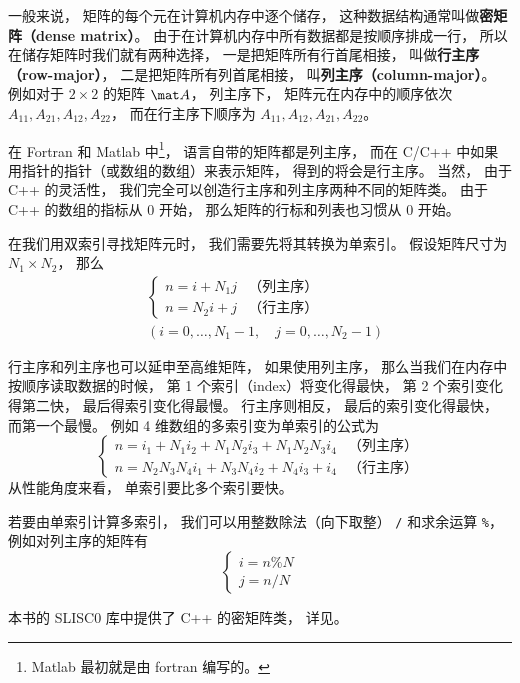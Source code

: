 

一般来说， 矩阵的每个元在计算机内存中逐个储存， 这种数据结构通常叫做\textbf{密矩阵（dense matrix）}。 由于在计算机内存中所有数据都是按顺序排成一行， 所以在储存矩阵时我们就有两种选择， 一是把矩阵所有行首尾相接， 叫做\textbf{行主序（row-major）}， 二是把矩阵所有列首尾相接， 叫\textbf{列主序（column-major）}。 例如对于 $2 \times 2$ 的矩阵 $\mat A$， 列主序下， 矩阵元在内存中的顺序依次 $A_{11}, A_{21}, A_{12}, A_{22}$， 而在行主序下顺序为 $A_{11},A_{12},A_{21},A_{22}$。

在 Fortran 和 Matlab 中\footnote{Matlab 最初就是由 fortran 编写的。}， 语言自带的矩阵都是列主序， 而在 C/C++ 中如果用指针的指针（或数组的数组）来表示矩阵， 得到的将会是行主序。 当然， 由于 C++ 的灵活性， 我们完全可以创造行主序和列主序两种不同的矩阵类。 由于 C++ 的数组的指标从 0 开始， 那么矩阵的行标和列表也习惯从 0 开始。

在我们用双索引寻找矩阵元时， 我们需要先将其转换为单索引。 假设矩阵尺寸为 $N_1 \times N_2$， 那么
\begin{equation}
\begin{aligned}
&\begin{cases}
n = i + N_1 j  &\text{（列主序）}\\
n = N_2 i + j  &\text{（行主序）}
\end{cases}\\
&(i = 0, \dots, N_1-1,\quad j = 0, \dots, N_2-1)
\end{aligned}
\end{equation}

行主序和列主序也可以延申至高维矩阵， 如果使用列主序， 那么当我们在内存中按顺序读取数据的时候， 第 1 个索引（index）将变化得最快， 第 2 个索引变化得第二快， 最后得索引变化得最慢。 行主序则相反， 最后的索引变化得最快， 而第一个最慢。 例如 4 维数组的多索引变为单索引的公式为
\begin{equation}
\begin{cases}
n = i_1 + N_1 i_2 + N_1 N_2 i_3 + N_1 N_2 N_3 i_4  &\text{（列主序）}\\
n = N_2 N_3 N_4 i_1 + N_3 N_4 i_2 + N_4 i_3 + i_4  &\text{（行主序）}
\end{cases}
\end{equation}
从性能角度来看， 单索引要比多个索引要快。

若要由单索引计算多索引， 我们可以用整数除法（向下取整） \verb|/| 和求余运算 \verb|%|， 例如对列主序的矩阵有
\begin{equation}
\begin{cases}
i = n \% N\\
j = n / N
\end{cases}
\end{equation}

本书的 SLISC0 库中提供了 C++ 的密矩阵类， 详见。
